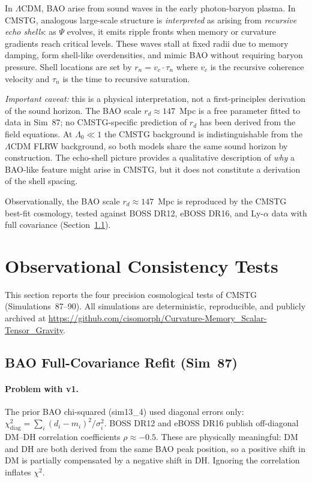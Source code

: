 \documentclass[12pt,a4paper]{article}
\begin{document}
In $\Lambda$CDM, BAO arise from sound waves in the early photon-baryon plasma.
In CMSTG, analogous large-scale structure is \emph{interpreted} as arising from
\emph{recursive echo shells}: as $\Psi$ evolves, it emits ripple fronts when
memory or curvature gradients reach critical levels. These waves stall at fixed
radii due to memory damping, form shell-like overdensities, and mimic BAO
without requiring baryon pressure. Shell locations are set by
$r_n = v_c \cdot \tau_n$ where $v_c$ is the recursive coherence velocity and
$\tau_n$ is the time to recursive saturation.

\emph{Important caveat:} this is a physical interpretation, not a
first-principles derivation of the sound horizon.  The BAO scale
$r_d \approx 147$~Mpc is a free parameter fitted to data in Sim~87;
no CMSTG-specific prediction of $r_d$ has been derived from the field equations.
At $\Lambda_0 \ll 1$ the CMSTG background is indistinguishable from the
$\Lambda$CDM FLRW background, so both models share the same sound horizon
by construction.  The echo-shell picture provides a qualitative description
of \emph{why} a BAO-like feature might arise in CMSTG, but it does not
constitute a derivation of the shell spacing.

Observationally, the BAO scale $r_d \approx 147$~Mpc is reproduced by the
CMSTG best-fit cosmology, tested against BOSS DR12, eBOSS DR16, and Ly-$\alpha$
data with full covariance (Section~\ref{sec:obs_bao}).

\section{Observational Consistency Tests}
\label{sec:observations}

This section reports the four precision cosmological tests of CMSTG
(Simulations~87--90). All simulations are deterministic, reproducible, and
publicly archived at \url{https://github.com/cisomorph/Curvature-Memory_Scalar-Tensor_Gravity}.

\subsection{BAO Full-Covariance Refit (Sim~87)}
\label{sec:obs_bao}

\paragraph{Problem with v1.} The prior BAO chi-squared (sim13\_4) used
diagonal errors only:
$\chi^2_{\mathrm{diag}} = \sum_i (d_i - m_i)^2 / \sigma_i^2$.
BOSS DR12 and eBOSS DR16 publish off-diagonal DM--DH correlation coefficients
$\rho \approx -0.5$. These are physically meaningful: DM and DH are both derived
from the same BAO peak position, so a positive shift in DM is partially compensated
by a negative shift in DH. Ignoring the correlation inflates $\chi^2$.
\end{document}
